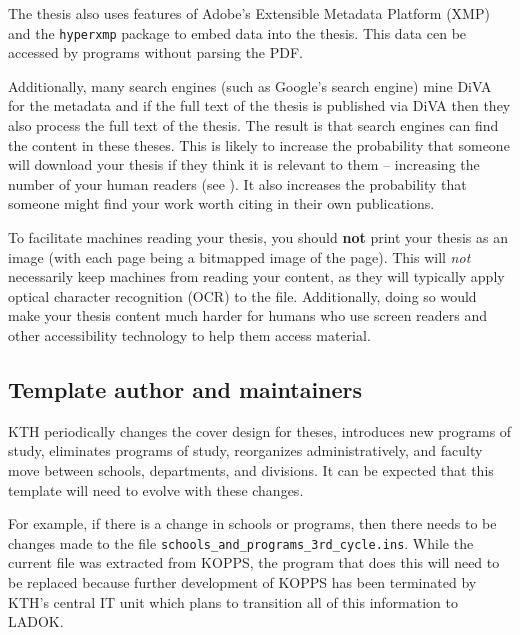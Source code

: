 \documentclass[12pt, twoside]{article}
\begin{document}
The thesis also uses features of Adobe's Extensible Metadata Platform (XMP) and the \texttt{hyperxmp} package to embed data into the thesis. This data cen be accessed by programs without parsing the PDF. 

Additionally, many search engines (such as Google's search engine) mine \gls{DiVA} for the metadata and if the full text of the thesis is published via \gls{DiVA} then they also process the full text of the thesis. The result is that search engines can find the content in these theses.  This is likely to increase the probability that someone will download your thesis if they think it is relevant to them -- increasing the number of your human readers (see ). It also increases the probability that someone might find your work worth citing in their own publications.

To facilitate machines reading your thesis, you should \textbf{not} print your thesis as an image (\ie with each page being a bitmapped image of the page). This will \textit{not} necessarily keep machines from reading your content, as they will typically apply optical character recognition (OCR) to the file. Additionally, doing so would make your thesis content much harder for humans who use screen readers and other accessibility technology to help them access material.

\subsection{Template author and maintainers}
\label{sec:maintainer}

\gls{KTH} periodically changes the cover design for theses, introduces new programs of study, eliminates programs of study, reorganizes administratively,
and faculty move between schools, departments, and divisions. It can be expected that this template will need to evolve with these changes.

For example, if there is a change in schools or programs, then there needs to be changes made to the file \texttt{schools\_and\_programs\_3rd\_cycle.ins}. While the current file was extracted from \gls{KOPPS}, the program that does this will need to be replaced because further development of \gls{KOPPS} has been terminated by KTH's central IT unit which plans to transition all of this information to \gls{LADOK}.
\end{document}
